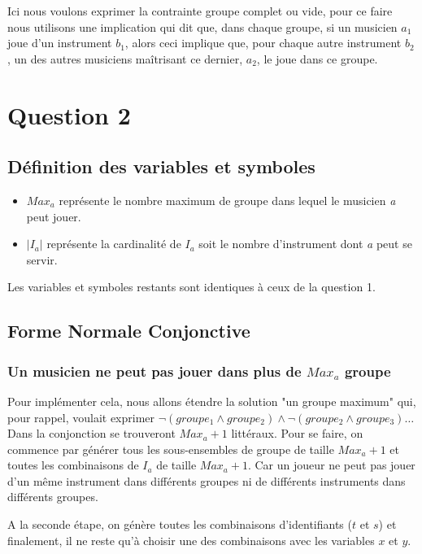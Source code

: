 \documentclass[11pt]{article}
\begin{document}
Ici nous voulons exprimer la contrainte groupe complet ou vide, pour ce faire nous utilisons une implication qui dit que, dans chaque groupe, si un musicien $a_1$ joue d'un instrument $b_1$, alors ceci implique que, pour chaque autre instrument $b_2$, un des autres musiciens maîtrisant ce dernier, $a_2$, le joue dans ce groupe.

\section{Question 2}

\subsection{Définition des variables et symboles}

\begin{itemize}
\item $Max_a$ représente le nombre maximum de groupe dans lequel le musicien \textit{a} peut jouer.
\item $|I_a|$ représente la cardinalité de $I_a$ soit le nombre d'instrument dont \textit{a} peut se servir.
\end{itemize}

Les variables et symboles restants sont identiques à ceux de la question 1.

\subsection{Forme Normale Conjonctive}

\subsubsection{Un musicien ne peut pas jouer dans plus de $Max_a$ groupe}

Pour implémenter cela, nous allons étendre la solution "un groupe maximum" qui, pour rappel, voulait exprimer $\neg (groupe_1 \wedge groupe_2) \wedge \neg (groupe_2 \wedge groupe_3) \ldots$
Dans la conjonction se trouveront $Max_a+1$ littéraux. Pour se faire, on commence par générer tous les sous-ensembles de groupe de taille $Max_a+1$ et toutes les combinaisons de $I_a$ de taille $Max_a+1$. Car un joueur ne peut pas jouer d'un même instrument dans différents groupes ni de différents instruments dans différents groupes. 

A la seconde étape, on génère toutes les combinaisons d'identifiants ($t$ et $s$) et finalement, il ne reste qu'à choisir une des combinaisons avec les variables $x$ et $y$.
\end{document}
